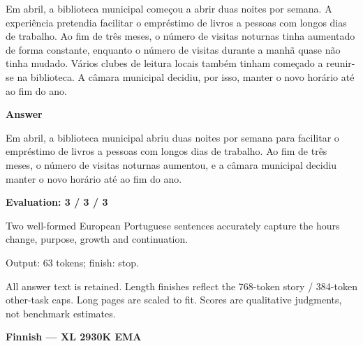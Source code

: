 \documentclass[10pt]{article}
\begin{document}
{\begin{minipage}{\textwidth}
\par\smallskip
Em abril, a biblioteca municipal começou a abrir duas noites por semana. A experiência pretendia facilitar o empréstimo de livros a pessoas com longos dias de trabalho. Ao fim de três meses, o número de visitas noturnas tinha aumentado de forma constante, enquanto o número de visitas durante a manhã quase não tinha mudado. Vários clubes de leitura locais também tinham começado a reunir-se na biblioteca. A câmara municipal decidiu, por isso, manter o novo horário até ao fim do ano.\par\smallskip
\textbf{Answer}\par Em abril, a biblioteca municipal abriu duas noites por semana para facilitar o empréstimo de livros a pessoas com longos dias de trabalho. Ao fim de três meses, o número de visitas noturnas aumentou, e a câmara municipal decidiu manter o novo horário até ao fim do ano.\par\smallskip
\textbf{Evaluation: 3 / 3 / 3}\par Two well-formed European Portuguese sentences accurately capture the hours change, purpose, growth and continuation.
\par {\color{gray} Output: 63 tokens; finish: stop.}\par
\medskip\footnotesize All answer text is retained. Length finishes reflect the 768-token story / 384-token other-task caps. Long pages are scaled to fit. Scores are qualitative judgments, not benchmark estimates.
\end{minipage}}%
\noindent\ifdim\dimexpr\ht\languagepage+\dp\languagepage\relax>0.93\textheight%
\resizebox*{!}{0.93\textheight}{\usebox{\languagepage}}%
\else\usebox{\languagepage}\fi%
\clearpage
{\Large\bfseries Finnish --- XL 2930K EMA}\par\smallskip
\end{document}

